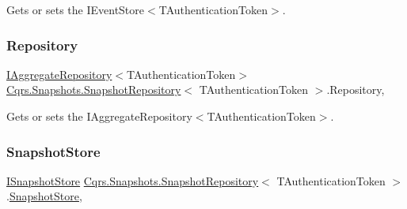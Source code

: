 Gets or sets the I\+Event\+Store$<$\+T\+Authentication\+Token$>$. 

\mbox{\label{classCqrs_1_1Snapshots_1_1SnapshotRepository_a64b1457cd45056fb7affd2aa8cd07d9e_a64b1457cd45056fb7affd2aa8cd07d9e}} 
\subsubsection{\texorpdfstring{Repository}{Repository}}
{\footnotesize\ttfamily \hyperlink{interfaceCqrs_1_1Domain_1_1IAggregateRepository}{I\+Aggregate\+Repository}$<$T\+Authentication\+Token$>$ \hyperlink{classCqrs_1_1Snapshots_1_1SnapshotRepository}{Cqrs.\+Snapshots.\+Snapshot\+Repository}$<$ T\+Authentication\+Token $>$.Repository\hspace{0.3cm}{\ttfamily [get]}, {\ttfamily [protected]}}



Gets or sets the I\+Aggregate\+Repository$<$\+T\+Authentication\+Token$>$. 

\mbox{\label{classCqrs_1_1Snapshots_1_1SnapshotRepository_aba01e9f20eb41e6f3e4476a7f3182275_aba01e9f20eb41e6f3e4476a7f3182275}} 
\subsubsection{\texorpdfstring{Snapshot\+Store}{SnapshotStore}}
{\footnotesize\ttfamily \hyperlink{interfaceCqrs_1_1Snapshots_1_1ISnapshotStore}{I\+Snapshot\+Store} \hyperlink{classCqrs_1_1Snapshots_1_1SnapshotRepository}{Cqrs.\+Snapshots.\+Snapshot\+Repository}$<$ T\+Authentication\+Token $>$.\hyperlink{classCqrs_1_1Snapshots_1_1SnapshotStore}{Snapshot\+Store}\hspace{0.3cm}{\ttfamily [get]}, {\ttfamily [protected]}}



